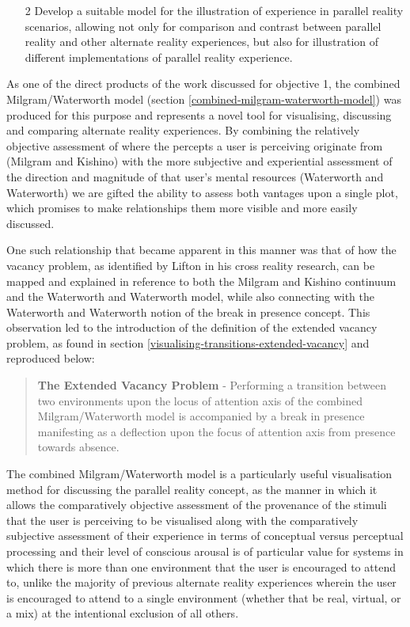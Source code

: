\begin{enumerate}
	\item[2] Develop a suitable model for the illustration of experience in parallel reality scenarios, allowing not only for comparison and contrast between parallel reality and other alternate reality experiences, but also for illustration of different implementations of parallel reality experience.
\end{enumerate}

As one of the direct products of the work discussed for objective 1, the combined Milgram/Waterworth model (section \ref{combined-milgram-waterworth-model}) was produced for this purpose and represents a novel tool for visualising, discussing and comparing alternate reality experiences. By combining the relatively objective assessment of where the percepts a user is perceiving originate from (Milgram and Kishino) with the more subjective and experiential assessment of the direction and magnitude of that user's mental resources (Waterworth and Waterworth) we are gifted the ability to assess both vantages upon a single plot, which promises to make relationships them more visible and more easily discussed.

One such relationship that became apparent in this manner was that of how the vacancy problem, as identified by Lifton in his cross reality research, can be mapped and explained in reference to both the Milgram and Kishino continuum and the Waterworth and Waterworth model, while also connecting with the Waterworth and Waterworth notion of the break in presence concept. This observation led to the introduction of the definition of the extended vacancy problem, as found in section \ref{visualising-transitions-extended-vacancy} and reproduced below:

\begin{quote}
	\textbf{The Extended Vacancy Problem} - Performing a transition between two environments upon the locus of attention axis of the combined Milgram/Waterworth model is accompanied by a break in presence manifesting as a deflection upon the focus of attention axis from presence towards absence.
\end{quote}

The combined Milgram/Waterworth model is a particularly useful visualisation method for discussing the parallel reality concept, as the manner in which it allows the comparatively objective assessment of the provenance of the stimuli that the user is perceiving to be visualised along with the comparatively subjective assessment of their experience in terms of conceptual versus perceptual processing and their level of conscious arousal is of particular value for systems in which there is more than one environment that the user is encouraged to attend to, unlike the majority of previous alternate reality experiences wherein the user is encouraged to attend to a single environment (whether that be real, virtual, or a mix) at the intentional exclusion of all others.

